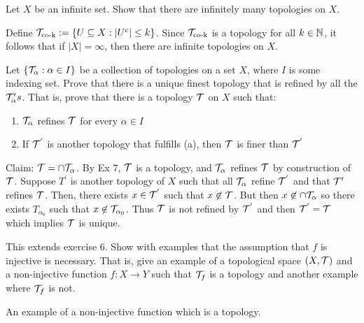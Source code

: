 \begin{ExerciseList}
    \Exercise[difficulty=1] Let $X$ be an infinite set. Show that %
    there are infinitely many topologies on $X$.

    \Answer Define $\T_{\text{co-k}} := \{U\subseteq X: %
    |U^c|\leq k\}$. Since $\mathcal{T}_{\text{co-k}}$ is a topology for all %
    $k\in\mathbb{N}$, it follows that if $|X|=\infty$, then there are %
    infinite topologies on $X$.

    \Exercise[difficulty=1] Let $\{\mathcal{T}_{\alpha} : \alpha\in I\}$ be %
    a collection of topologies on a set $X$, where $I$ is some %
    indexing set. Prove that there is a unique finest topology that %
    is refined by all the $\mathcal{T}_{\alpha}'s$. That is, prove that %
    there is a topology $\mathcal{T}$ on $X$ such that:
    \begin{enumerate}
        \item $\mathcal{T}_{\alpha}$ refines $\mathcal{T}$ for every $\alpha\in I$
        \item If $\mathcal{T}^{'}$ is another topology that fulfills (a), %
            then $\mathcal{T}$ is finer than $\mathcal{T}^{'}$
    \end{enumerate}

    \Answer Claim: $\mathcal{T} = \cap \mathcal{T}_{\alpha}$. By Ex 7, $\mathcal{T}$ is a %
    topology, and $\mathcal{T}_{\alpha}$ refines $\mathcal{T}$ by construction of %
    $\mathcal{T}$. Suppose $T^{'}$ is another topology of $X$ such that %
    all $\mathcal{T}_{\alpha}$ refine $\mathcal{T}^{'}$ and that $\mathcal{T}{'}$ refines %
    $\mathcal{T}$. Then, there exists $x\in\mathcal{T}^{'}$ such that $x\not\in\mathcal{T}$.
    But then $x\not\in \cap \mathcal{T}_{\alpha}$ so there exists %
    $T_{\alpha_0}$ such that $x\not\in\mathcal{T}_{\alpha_0}$. Thus $\mathcal{T}$ %
    is not refined by $\mathcal{T}^{'}$ and then $\mathcal{T}^{'}=\mathcal{T}$ which implies %
    $\mathcal{T}$ is unique.

    \Exericse[difficulty=1] This extends exercise 6. Show with %
    examples that the assumption that $f$ is injective is necessary.
    That is, give an example of a topological space $(X,\mathcal{T})$ and %
    a non-injective function $f:X\to Y$ such that $\mathcal{T}_f$ is a %
    topology and another example where $\mathcal{T}_f$ is not.

    \Answer An example of a non-injective function which is a %
    topology.
\end{ExerciseList}
